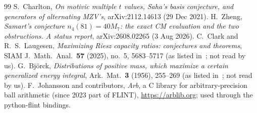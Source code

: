 \begin{thebibliography}{99}
 S.~Charlton, \emph{On motivic multiple $t$ values, Saha's basis conjecture, and generators of alternating MZV's}, arXiv:2112.14613 (29 Dec 2021).
 H.~Zheng, \emph{Samart's conjecture $n_4(81)=40M_7$: the exact CM evaluation and the two obstructions. A status report}, arXiv:2608.02265 (3 Aug 2026).
 C.~Clark and R.~S.~Laugesen, \emph{Maximizing Riesz capacity ratios: conjectures and theorems}, SIAM J.\ Math.\ Anal.\ \textbf{57} (2025), no.~5, 5683--5717 (as listed in~\cite{Fan}; not read by us).
 G.~Bj\"orck, \emph{Distributions of positive mass, which maximize a certain generalized energy integral}, Ark.\ Mat.\ \textbf{3} (1956), 255--269 (as listed in~\cite{Fan}; not read by us).
 F.~Johansson and contributors, \emph{Arb}, a C library for arbitrary-precision ball arithmetic (since 2023 part of FLINT), \url{https://arblib.org}; used through the python-flint bindings.
\end{thebibliography}
